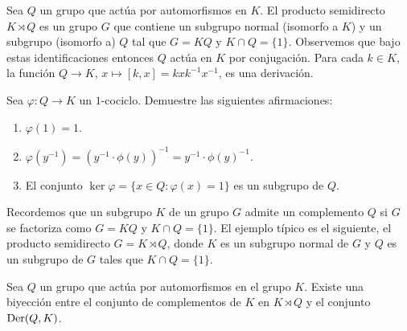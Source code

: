 \begin{example}
	Sea $Q$ un grupo que actúa por automorfismos en $K$. El producto semidirecto $K\rtimes Q$ 
	es un grupo $G$ que contiene un subgrupo normal (isomorfo a $K$) y un subgrupo
	(isomorfo a) $Q$ tal que $G=KQ$ y $K\cap Q=\{1\}$. Observemos que bajo estas identificaciones 
	entonces $Q$ actúa en $K$ por conjugación. Para cada $k\in K$, la
	función $Q\to K$, $x\mapsto [k,x]=kxk^{-1}x^{-1}$, es una derivación.
\end{example}


\begin{exercise}
	\label{xca:1cocycle}
	Sea $\varphi\colon Q\to K$ un $1$-cociclo. Demuestre las siguientes afirmaciones:
	\begin{enumerate}
		\item $\varphi(1)=1$.
		\item $\varphi(y^{-1})=(y^{-1}\cdot\phi(y))^{-1}=y^{-1}\cdot\phi(y)^{-1}$.
		\item El conjunto $\ker\varphi=\{x\in Q:\varphi(x)=1\}$ 	es un
			subgrupo de $Q$. 
	\end{enumerate}
\end{exercise}

Recordemos que un subgrupo $K$ de un grupo $G$ admite un complemento $Q$ si 
$G$ se factoriza como 
$G=KQ$ y $K\cap Q=\{1\}$. 
El ejemplo típico es el siguiente, el producto semidirecto $G=K\rtimes Q$, donde $K$ es un subgrupo
normal de $G$ y $Q$ es un subgrupo de $G$ tales que $K\cap Q=\{1\}$. 

\begin{theorem}
	\label{theorem:complementos}
	Sea $Q$ un grupo que actúa por automorfismos en el grupo $K$.  Existe una
	biyección entre el conjunto de complementos de $K$ en $K\rtimes Q$ y el
	conjunto $\operatorname{Der}(Q,K)$.
\end{theorem}

